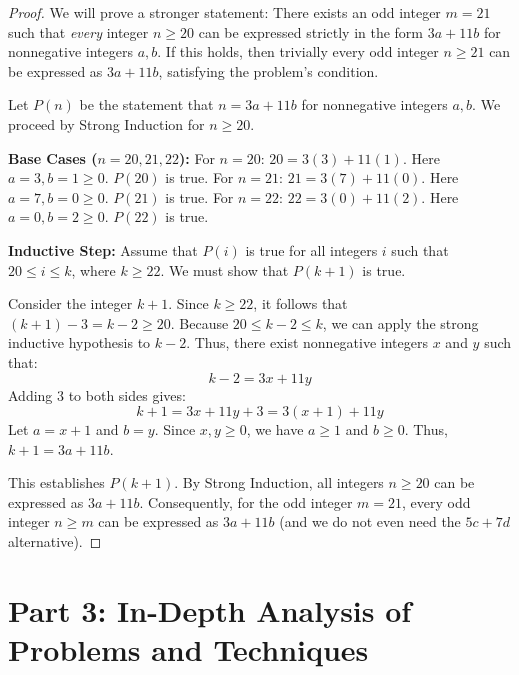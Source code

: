 \documentclass[11pt, a4paper]{article}
\theoremstyle{definition}
\theoremstyle{remark}
\begin{document}
\begin{proof}
    We will prove a stronger statement: There exists an odd integer $m = 21$ such that \textit{every} integer $n \ge 20$ can be expressed strictly in the form $3a + 11b$ for nonnegative integers $a, b$. If this holds, then trivially every odd integer $n \ge 21$ can be expressed as $3a + 11b$, satisfying the problem's condition.
    
    Let $P(n)$ be the statement that $n = 3a + 11b$ for nonnegative integers $a, b$. We proceed by Strong Induction for $n \ge 20$.
    
    \textbf{Base Cases ($n=20, 21, 22$):}
    For $n=20$: $20 = 3(3) + 11(1)$. Here $a=3, b=1 \ge 0$. $P(20)$ is true.
    For $n=21$: $21 = 3(7) + 11(0)$. Here $a=7, b=0 \ge 0$. $P(21)$ is true.
    For $n=22$: $22 = 3(0) + 11(2)$. Here $a=0, b=2 \ge 0$. $P(22)$ is true.
    
    \textbf{Inductive Step:}
    Assume that $P(i)$ is true for all integers $i$ such that $20 \le i \le k$, where $k \ge 22$. We must show that $P(k+1)$ is true.
    
    Consider the integer $k+1$. Since $k \ge 22$, it follows that $(k+1) - 3 = k - 2 \ge 20$.
    Because $20 \le k-2 \le k$, we can apply the strong inductive hypothesis to $k-2$. Thus, there exist nonnegative integers $x$ and $y$ such that:
    \[ k - 2 = 3x + 11y \]
    Adding 3 to both sides gives:
    \[ k + 1 = 3x + 11y + 3 = 3(x+1) + 11y \]
    Let $a = x+1$ and $b = y$. Since $x, y \ge 0$, we have $a \ge 1$ and $b \ge 0$. Thus, $k+1 = 3a + 11b$.
    
    This establishes $P(k+1)$. By Strong Induction, all integers $n \ge 20$ can be expressed as $3a + 11b$. Consequently, for the odd integer $m = 21$, every odd integer $n \ge m$ can be expressed as $3a + 11b$ (and we do not even need the $5c + 7d$ alternative).
\end{proof}

\section{Part 3: In-Depth Analysis of Problems and Techniques}
\end{document}
